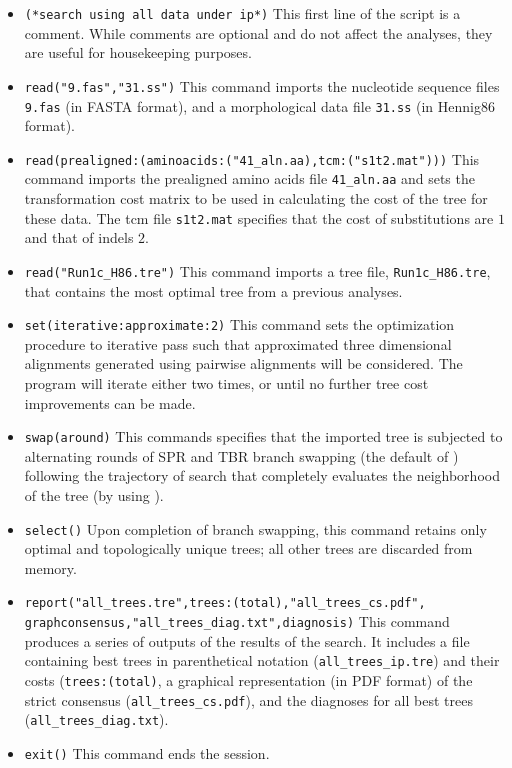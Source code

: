 \begin{itemize}
\item \texttt{(*search using all data under ip*)} This first line of the script is a comment. While comments are 
optional and do not affect the analyses, they are useful for housekeeping purposes.
\item \texttt{read("9.fas","31.ss")} This command imports the nucleotide sequence files \texttt{9.fas} (in FASTA 
format), and a morphological data file \texttt{31.ss} (in Hennig86 format).
\item \texttt{read(prealigned:(aminoacids:("41\_aln.aa),tcm:("s1t2.mat")))} This command imports the prealigned
amino acids file \texttt{41\_aln.aa} and sets the transformation cost matrix to be used in calculating the cost of the tree
for these data.  The tcm file \texttt{s1t2.mat} specifies that the cost of substitutions are $1$ and that of indels $2$.
\item \texttt{read("Run1c\_H86.tre")} This command imports a tree file, \texttt{Run1c\_H86.tre}, that contains the most 
optimal tree from a previous analyses. 
\item \texttt{set(iterative:approximate:2)} This command sets the optimization procedure to iterative pass such 
that approximated three dimensional alignments generated using pairwise alignments will be considered.  
The program will iterate either two times, or until no further tree cost improvements can be made.
\item \texttt{swap(around)} This commands specifies that the imported tree is subjected to alternating rounds of SPR 
and TBR branch swapping (the default of \poy) following the trajectory of search that completely 
evaluates the neighborhood of the tree (by using ).
\item \texttt{select()} Upon completion of branch swapping, this command retains only optimal and topologically 
unique trees; all other trees are discarded from memory.
\item \texttt{report("all\_trees.tre",trees:(total),"all\_trees\_cs.pdf",\\graphconsensus,"all\_trees\_diag.txt",diagnosis)} 
This command produces a series of outputs of the results of the search. It includes a file containing best trees in parenthetical 
notation (\texttt{all\_trees\_ip.tre}) and their costs (\texttt{trees:(total)}, a graphical representation (in PDF format) of the strict 
consensus (\texttt{all\_trees\_cs.pdf}), and the diagnoses for all best trees (\texttt{all\_trees\_diag.txt}).
\item \texttt{exit()} This command ends the \poy session.
\end{itemize}


